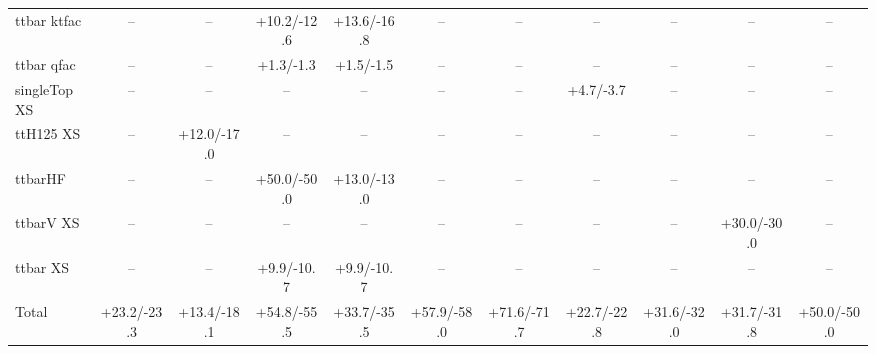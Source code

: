 \begin{tabular}{l*{10}{c}}
$$ttbar ktfac & -- & -- & +10.2/-12.6 & +13.6/-16.8 & -- & -- & -- & -- & -- & --\\
ttbar qfac & -- & -- & +1.3/-1.3 & +1.5/-1.5 & -- & -- & -- & -- & -- & --\\
singleTop XS & -- & -- & -- & -- & -- & -- & +4.7/-3.7 & -- & -- & --\\
ttH125 XS & -- & +12.0/-17.0 & -- & -- & -- & -- & -- & -- & -- & --\\
ttbarHF & -- & -- & +50.0/-50.0 & +13.0/-13.0 & -- & -- & -- & -- & -- & --\\
ttbarV XS & -- & -- & -- & -- & -- & -- & -- & -- & +30.0/-30.0 & --\\
ttbar XS & -- & -- & +9.9/-10.7 & +9.9/-10.7 & -- & -- & -- & -- & -- & --\\
\hline
Total & +23.2/-23.3 & +13.4/-18.1 & +54.8/-55.5 & +33.7/-35.5 & +57.9/-58.0 & +71.6/-71.7 & +22.7/-22.8 & +31.6/-32.0 & +31.7/-31.8 & +50.0/-50.0\\
\hline\hline
\end{tabular}
\vspace{0.5cm}
